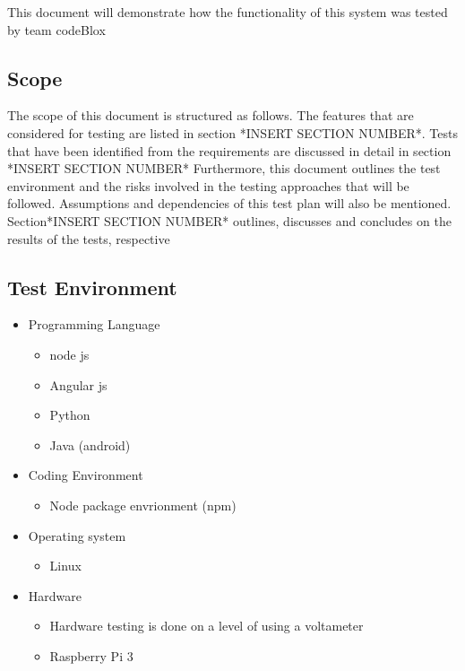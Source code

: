 \documentclass[a4paper,12pt]{article}
\begin{document}
		This document will demonstrate how the functionality of this system was tested by team codeBlox
		
		\subsection{Scope}
		The scope of this document is structured as follows. The features that are considered for testing are listed in section *INSERT SECTION NUMBER*. Tests that have been identified from the requirements are discussed in detail in section *INSERT SECTION NUMBER* Furthermore, this document outlines the test environment and the risks involved in the testing approaches that will be followed. Assumptions and dependencies of this test plan will also be mentioned. Section*INSERT SECTION NUMBER* outlines, discusses and concludes on the results of the tests, respective
		
		\subsection{Test Environment}
			\begin{itemize}
				\item Programming Language
					\begin{itemize}
						\item node js
						\item Angular js
						\item Python
						\item Java (android)
					\end{itemize}
			
			\item Coding Environment
				\begin{itemize}
					\item Node package envrionment (npm)
				\end{itemize}
		
			\item Operating system
				\begin{itemize}
					\item Linux
				\end{itemize}
		
			\item Hardware
				\begin{itemize}
					\item Hardware testing is done on a level of using a voltameter
					\item Raspberry Pi 3
				\end{itemize}
		\end{itemize}
	
\end{document}
